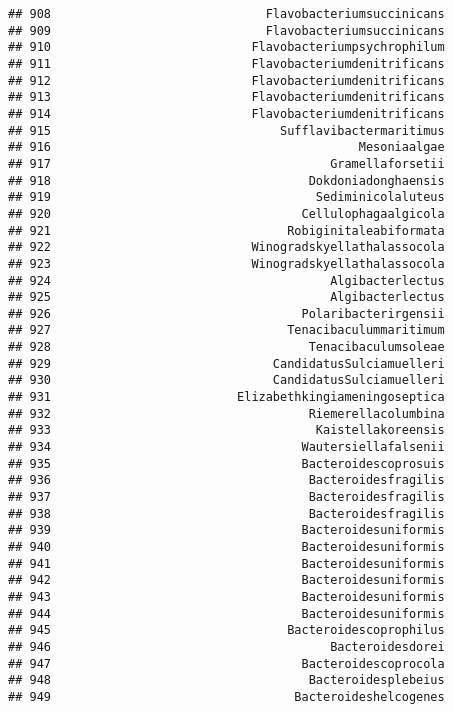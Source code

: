 \documentclass[
]{article}
\begin{document}
\begin{verbatim}
## 908                              Flavobacteriumsuccinicans
## 909                              Flavobacteriumsuccinicans
## 910                            Flavobacteriumpsychrophilum
## 911                            Flavobacteriumdenitrificans
## 912                            Flavobacteriumdenitrificans
## 913                            Flavobacteriumdenitrificans
## 914                            Flavobacteriumdenitrificans
## 915                                Sufflavibactermaritimus
## 916                                           Mesoniaalgae
## 917                                       Gramellaforsetii
## 918                                    Dokdoniadonghaensis
## 919                                     Sediminicolaluteus
## 920                                   Cellulophagaalgicola
## 921                                 Robiginitaleabiformata
## 922                            Winogradskyellathalassocola
## 923                            Winogradskyellathalassocola
## 924                                       Algibacterlectus
## 925                                       Algibacterlectus
## 926                                   Polaribacterirgensii
## 927                                 Tenacibaculummaritimum
## 928                                    Tenacibaculumsoleae
## 929                               CandidatusSulciamuelleri
## 930                               CandidatusSulciamuelleri
## 931                          Elizabethkingiameningoseptica
## 932                                    Riemerellacolumbina
## 933                                     Kaistellakoreensis
## 934                                   Wautersiellafalsenii
## 935                                   Bacteroidescoprosuis
## 936                                    Bacteroidesfragilis
## 937                                    Bacteroidesfragilis
## 938                                    Bacteroidesfragilis
## 939                                   Bacteroidesuniformis
## 940                                   Bacteroidesuniformis
## 941                                   Bacteroidesuniformis
## 942                                   Bacteroidesuniformis
## 943                                   Bacteroidesuniformis
## 944                                   Bacteroidesuniformis
## 945                                 Bacteroidescoprophilus
## 946                                       Bacteroidesdorei
## 947                                   Bacteroidescoprocola
## 948                                    Bacteroidesplebeius
## 949                                  Bacteroideshelcogenes

\end{verbatim}
\end{document}
